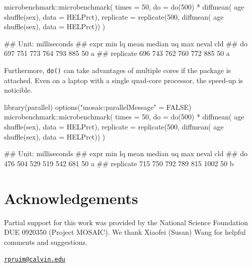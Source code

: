 \begin{Schunk}
\begin{Sinput}
microbenchmark::microbenchmark( times = 50,
  do = do(500) * diffmean( age ~ shuffle(sex), data = HELPrct),
  replicate = replicate(500, diffmean( age ~ shuffle(sex), data = HELPrct))
)
\end{Sinput}
\begin{Soutput}
## Unit: milliseconds
##       expr min  lq mean median  uq max neval cld
##         do 697 751  773    764 793 885    50   a
##  replicate 696 743  762    760 772 885    50   a
\end{Soutput}
\end{Schunk}

\noindent
Furthermore, \texttt{do()} can take advantages of multiple cores if the
 package is attached. Even on a laptop with a single
quad-core processor, the speed-up is noticible.

\begin{Schunk}
\begin{Sinput}
library(parallel)
options("mosaic:parallelMessage" = FALSE)
microbenchmark::microbenchmark( times = 50,
  do = do(500) * diffmean( age ~ shuffle(sex), data = HELPrct),
  replicate = replicate(500, diffmean( age ~ shuffle(sex), data = HELPrct))
)
\end{Sinput}
\begin{Soutput}
## Unit: milliseconds
##       expr min  lq mean median  uq  max neval cld
##         do 476 504  529    519 542  681    50  a 
##  replicate 715 750  792    789 815 1002    50   b
\end{Soutput}
\end{Schunk}

\section{Acknowledgements}\label{acknowledgements}

Partial support for this work was provided by the National Science
Foundation DUE 0920350 (Project MOSAIC). We thank Xiaofei (Susan) Wang
for helpful comments and suggestions.



\address{%
Randall Pruim\\
Calvin College\\
Department of Mathematics and Statistics\\ 3201 Burton St SE\\ Grand Rapids, MI 49546\\
}
\href{mailto:rpruim@calvin.edu}{\nolinkurl{rpruim@calvin.edu}}

